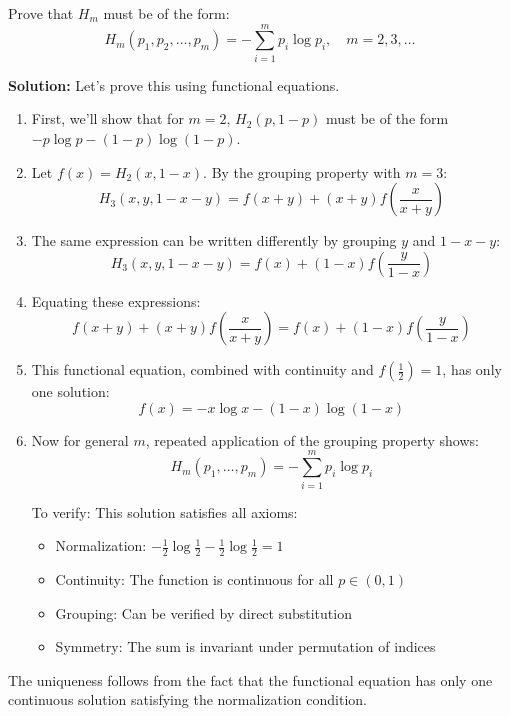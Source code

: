 \documentclass{article}
\begin{document}
\begin{enumerate}
    Prove that $H_m$ must be of the form:
    \[
        H_m(p_1, p_2, \ldots, p_m) = -\sum_{i=1}^m p_i \log p_i, \quad m = 2, 3, \ldots
    \]
    
    \textbf{Solution:} Let's prove this using functional equations.

    \begin{enumerate}
        \item First, we'll show that for $m=2$, $H_2(p,1-p)$ must be of the form $-p\log p - (1-p)\log(1-p)$.
        
        \item Let $f(x) = H_2(x,1-x)$. By the grouping property with $m=3$:
        \[
            H_3(x,y,1-x-y) = f(x+y) + (x+y)f(\frac{x}{x+y})
        \]
        
        \item The same expression can be written differently by grouping $y$ and $1-x-y$:
        \[
            H_3(x,y,1-x-y) = f(x) + (1-x)f(\frac{y}{1-x})
        \]
        
        \item Equating these expressions:
        \[
            f(x+y) + (x+y)f(\frac{x}{x+y}) = f(x) + (1-x)f(\frac{y}{1-x})
        \]
        
        \item This functional equation, combined with continuity and $f(\frac{1}{2})=1$, has only one solution:
        \[
            f(x) = -x\log x - (1-x)\log(1-x)
        \]
        
        \item Now for general $m$, repeated application of the grouping property shows:
        \[
            H_m(p_1,\ldots,p_m) = -\sum_{i=1}^m p_i\log p_i
        \]
        
        To verify: This solution satisfies all axioms:
        \begin{itemize}
            \item Normalization: $-\frac{1}{2}\log\frac{1}{2} - \frac{1}{2}\log\frac{1}{2} = 1$
            \item Continuity: The function is continuous for all $p \in (0,1)$
            \item Grouping: Can be verified by direct substitution
            \item Symmetry: The sum is invariant under permutation of indices
        \end{itemize}
    \end{enumerate}

    The uniqueness follows from the fact that the functional equation has only one continuous solution satisfying the normalization condition.


\end{enumerate}
\end{document}
